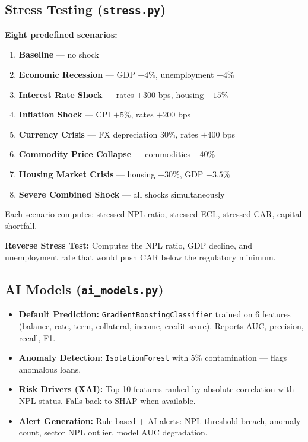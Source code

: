 \documentclass[12pt,a4paper]{article}
\begin{document}
\subsection{Stress Testing (\texttt{stress.py})}

\textbf{Eight predefined scenarios:}

\begin{enumerate}[itemsep=2pt]
    \item \textbf{Baseline} --- no shock
    \item \textbf{Economic Recession} --- GDP $-4\%$, unemployment $+4\%$
    \item \textbf{Interest Rate Shock} --- rates $+300$ bps, housing $-15\%$
    \item \textbf{Inflation Shock} --- CPI $+5\%$, rates $+200$ bps
    \item \textbf{Currency Crisis} --- FX depreciation $30\%$, rates $+400$ bps
    \item \textbf{Commodity Price Collapse} --- commodities $-40\%$
    \item \textbf{Housing Market Crisis} --- housing $-30\%$, GDP $-3.5\%$
    \item \textbf{Severe Combined Shock} --- all shocks simultaneously
\end{enumerate}

Each scenario computes: stressed NPL ratio, stressed ECL, stressed CAR, capital shortfall.

\textbf{Reverse Stress Test:} Computes the NPL ratio, GDP decline, and unemployment rate that would push CAR below the regulatory minimum.

\subsection{AI Models (\texttt{ai\_models.py})}

\begin{itemize}
    \item \textbf{Default Prediction:} \texttt{GradientBoostingClassifier} trained on 6 features (balance, rate, term, collateral, income, credit score). Reports AUC, precision, recall, F1.
    \item \textbf{Anomaly Detection:} \texttt{IsolationForest} with 5\% contamination --- flags anomalous loans.
    \item \textbf{Risk Drivers (XAI):} Top-10 features ranked by absolute correlation with NPL status. Falls back to SHAP when available.
    \item \textbf{Alert Generation:} Rule-based + AI alerts: NPL threshold breach, anomaly count, sector NPL outlier, model AUC degradation.
\end{itemize}
\end{document}
